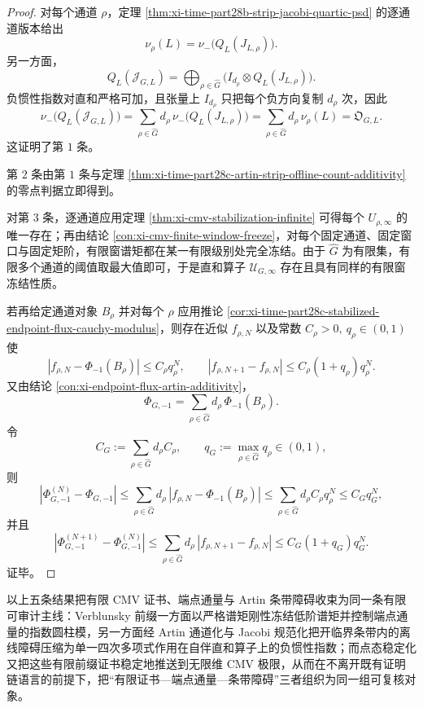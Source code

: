 \begin{proof}
对每个通道 \(\rho\)，定理 \ref{thm:xi-time-part28b-strip-jacobi-quartic-psd} 的逐通道版本给出
\[
\nu_\rho(L)=\nu_-\!\bigl(Q_L(J_{L,\rho})\bigr).
\]
另一方面，
\[
Q_L(\mathcal J_{G,L})
=
\bigoplus_{\rho\in\widehat G}
\bigl(I_{d_\rho}\otimes Q_L(J_{L,\rho})\bigr).
\]
负惯性指数对直和严格可加，且张量上 \(I_{d_\rho}\) 只把每个负方向复制 \(d_\rho\) 次，因此
\[
\nu_-\!\bigl(Q_L(\mathcal J_{G,L})\bigr)
=
\sum_{\rho\in\widehat G} d_\rho\,\nu_-\!\bigl(Q_L(J_{L,\rho})\bigr)
=
\sum_{\rho\in\widehat G} d_\rho\,\nu_\rho(L)
=
\mathfrak O_{G,L}.
\]
这证明了第 \(1\) 条。

第 \(2\) 条由第 \(1\) 条与定理 \ref{thm:xi-time-part28c-artin-strip-offline-count-additivity} 的零点判据立即得到。

对第 \(3\) 条，逐通道应用定理 \ref{thm:xi-cmv-stabilization-infinite} 可得每个 \(U_{\rho,\infty}\) 的唯一存在；再由结论 \ref{con:xi-cmv-finite-window-freeze}，对每个固定通道、固定窗口与固定矩阶，有限窗谱矩都在某一有限级别处完全冻结。由于 \(\widehat G\) 为有限集，有限多个通道的阈值取最大值即可，于是直和算子 \(\mathcal U_{G,\infty}\) 存在且具有同样的有限窗冻结性质。

若再给定通道对象 \(B_\rho\) 并对每个 \(\rho\) 应用推论 \ref{cor:xi-time-part28c-stabilized-endpoint-flux-cauchy-modulus}，则存在近似 \(f_{\rho,N}\) 以及常数 \(C_\rho>0,\ q_\rho\in(0,1)\) 使
\[
|f_{\rho,N}-\Phi_{-1}(B_\rho)|\le C_\rho q_\rho^N,
\qquad
|f_{\rho,N+1}-f_{\rho,N}|\le C_\rho(1+q_\rho)q_\rho^N.
\]
又由结论 \ref{con:xi-endpoint-flux-artin-additivity}，
\[
\Phi_{G,-1}
=
\sum_{\rho\in\widehat G} d_\rho\,\Phi_{-1}(B_\rho).
\]
令
\[
C_G:=\sum_{\rho\in\widehat G} d_\rho C_\rho,
\qquad
q_G:=\max_{\rho\in\widehat G} q_\rho\in(0,1),
\]
则
\[
|\Phi_{G,-1}^{(N)}-\Phi_{G,-1}|
\le
\sum_{\rho\in\widehat G} d_\rho\,|f_{\rho,N}-\Phi_{-1}(B_\rho)|
\le
\sum_{\rho\in\widehat G} d_\rho C_\rho q_\rho^N
\le C_G q_G^N,
\]
并且
\[
|\Phi_{G,-1}^{(N+1)}-\Phi_{G,-1}^{(N)}|
\le
\sum_{\rho\in\widehat G} d_\rho\,|f_{\rho,N+1}-f_{\rho,N}|
\le
C_G(1+q_G)q_G^N.
\]
证毕。
\end{proof}

\noindent
以上五条结果把有限 CMV 证书、端点通量与 Artin 条带障碍收束为同一条有限可审计主线：Verblunsky 前缀一方面以严格谱矩刚性冻结低阶谱矩并控制端点通量的指数圆柱模，另一方面经 Artin 通道化与 Jacobi 规范化把开临界条带内的离线障碍压缩为单一四次多项式作用在自伴直和算子上的负惯性指数；而点态稳定化又把这些有限前缀证书稳定地推送到无限维 CMV 极限，从而在不离开既有证明链语言的前提下，把“有限证书—端点通量—条带障碍”三者组织为同一组可复核对象。

\endinput
